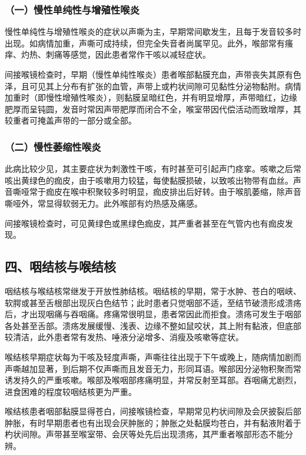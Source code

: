 \subsubsection{（一）慢性单纯性与增殖性喉炎}

慢性单纯性与增殖性喉炎的症状以声嘶为主，早期常间歇发生，且每于发音较多时出现。如病情加重，声嘶可成持续，但完全失音者尚属罕见。此外，喉部常有瘙痒、灼热、刺痛等感觉，因此患者常作干咳以减轻症状。

间接喉镜检查时，早期（慢性单纯性喉炎）患者喉部黏膜充血，声带丧失其原有色泽，且可见其上分布有扩张的血管，声带上或杓状间隙可见黏性分泌物黏附。病情加重时（即慢性增殖性喉炎），则黏膜呈暗红色，并有明显增厚，声带暗红，边缘肥厚而呈钝圆，发音时常因声带肥厚而闭合不全，喉室带因代偿活动而致增厚，其较重者可掩盖声带的一部分或全部。

\subsubsection{（二）慢性萎缩性喉炎}

此病比较少见，其主要症状为刺激性干咳，有时甚至可引起声门痉挛。咳嗽之后常咳出黄绿色的痂皮，由于咳嗽用力较猛，每使黏膜损破，以致咳出物带有血丝。声音嘶哑常于痂皮在喉中积聚较多时明显，痂皮排出后好转。由于喉肌萎缩，除声音嘶哑外，常显得软弱无力。此外喉部有灼热感及痛感。

间接喉镜检查时，可见黄绿色或黑绿色痂皮，其严重者甚至在气管内也有痂皮发现。

\subsection{四、咽结核与喉结核}

咽结核与喉结核常继发于开放性肺结核。咽结核的早期，常于水肿、苍白的咽峡、软腭或甚至舌根部出现灰白色结节；此时患者只觉咽部不适，至结节破溃形成溃疡后，才出现咽痛与吞咽痛。疼痛常很明显，患者常因此而拒食。溃疡可发生于咽部各处甚至舌部。溃疡发展缓慢、浅表、边缘不整如鼠咬状，其上附有黏液，但底部较清洁，此外患者常有发热、唾液分泌增多、消瘦及咳嗽等症状。

喉结核早期症状每为干咳及轻度声嘶，声嘶往往出现于下午或晚上，随病情加剧而声嘶越加显著，到后期不仅声嘶而且发音无力，形同耳语。喉部因分泌物积聚而常诱发持久的严重咳嗽。喉部及喉咽部疼痛明显，并常反射至耳部。吞咽痛尤剧烈，进食困难的程度较咽结核更为严重。

喉结核患者咽部黏膜显得苍白，间接喉镜检查，早期常见杓状间隙及会厌披裂后部肿胀，有时早期患者也有出现会厌肿胀的；肿胀之处黏膜均苍白，并有黏液附着于杓状间隙。声带甚至喉室带、会厌等处先后出现溃疡，其严重者喉部形态不能分辨。

